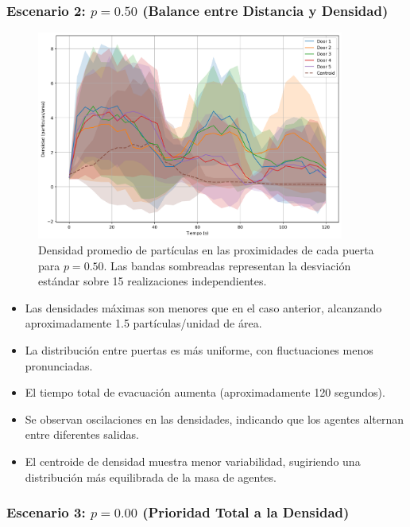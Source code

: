 \documentclass[12pt]{article}
\begin{document}
\subsubsection{Escenario 2: $p = 0.50$ (Balance entre Distancia y Densidad)}

\begin{figure}[H]
    \centering
    \includegraphics[width=0.9\textwidth]{img/circular_density_t_20_&_p_0.50.png}
    \caption{Densidad promedio de partículas en las proximidades de cada puerta para $p=0.50$. Las bandas sombreadas representan la desviación estándar sobre 15 realizaciones independientes.}
    \label{fig:densidad_p050}
\end{figure}

\begin{itemize}
    \item Las densidades máximas son menores que en el caso anterior, alcanzando aproximadamente 1.5 partículas/unidad de área.
    \item La distribución entre puertas es más uniforme, con fluctuaciones menos pronunciadas.
    \item El tiempo total de evacuación aumenta (aproximadamente 120 segundos).
    \item Se observan oscilaciones en las densidades, indicando que los agentes alternan entre diferentes salidas.
    \item El centroide de densidad muestra menor variabilidad, sugiriendo una distribución más equilibrada de la masa de agentes.
\end{itemize}

\subsubsection{Escenario 3: $p = 0.00$ (Prioridad Total a la Densidad)}
\end{document}
